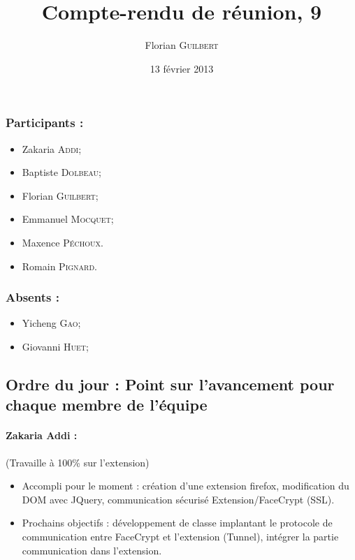 \documentclass[a4paper,10pt]{article}
\author{Florian \textsc{Guilbert}}
\title{Compte-rendu de réunion, 9}
\date{13 février 2013}
\begin{document}
\maketitle

\subsubsection*{Participants : }
\begin{itemize}
    \item Zakaria \textsc{Addi};
    \item Baptiste \textsc{Dolbeau};
    \item Florian \textsc{Guilbert};
    \item Emmanuel \textsc{Mocquet};
    \item Maxence  \textsc{Péchoux}.
    \item Romain \textsc{Pignard}.
\end{itemize}

\subsubsection*{Absents : }
\begin{itemize}
    \item Yicheng \textsc{Gao};
    \item Giovanni \textsc{Huet};
\end{itemize}

\subsection*{Ordre du jour : Point sur l'avancement pour chaque membre de l'équipe}


\paragraph{Zakaria Addi :} (Travaille à 100\% sur l'extension)\\
\begin{itemize}
    \item Accompli pour le moment : création d'une extension firefox, modification
        du DOM avec JQuery, communication sécurisé Extension/FaceCrypt (SSL).
    \item Prochains objectifs : développement de classe implantant le protocole
        de communication entre FaceCrypt et l'extension (Tunnel), intégrer la
        partie communication dans l'extension.
\end{itemize}
\end{document}
